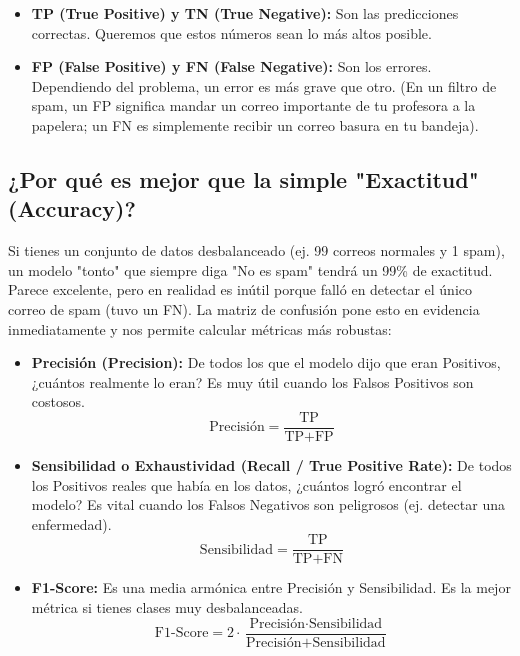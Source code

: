 \documentclass[]{article}
\begin{document}
\begin{itemize}
    \item \textbf{TP (True Positive) y TN (True Negative):} Son las predicciones correctas. Queremos que estos números sean lo más altos posible.
    \item \textbf{FP (False Positive) y FN (False Negative):} Son los errores. Dependiendo del problema, un error es más grave que otro. (En un filtro de spam, un FP significa mandar un correo importante de tu profesora a la papelera; un FN es simplemente recibir un correo basura en tu bandeja).
\end{itemize}

\subsection*{¿Por qué es mejor que la simple "Exactitud" (Accuracy)?}
Si tienes un conjunto de datos desbalanceado (ej. 99 correos normales y 1 spam), un modelo "tonto" que siempre diga "No es spam" tendrá un 99\% de exactitud. Parece excelente, pero en realidad es inútil porque falló en detectar el único correo de spam (tuvo un FN). La matriz de confusión pone esto en evidencia inmediatamente y nos permite calcular métricas más robustas:

\begin{itemize}
    \item \textbf{Precisión (Precision):} De todos los que el modelo dijo que eran Positivos, ¿cuántos realmente lo eran? Es muy útil cuando los Falsos Positivos son costosos.
    \begin{equation*}
    \text{Precisión} = \frac{\text{TP}}{\text{TP} + \text{FP}}
    \end{equation*}
    
    \item \textbf{Sensibilidad o Exhaustividad (Recall / True Positive Rate):} De todos los Positivos reales que había en los datos, ¿cuántos logró encontrar el modelo? Es vital cuando los Falsos Negativos son peligrosos (ej. detectar una enfermedad).
    \begin{equation*}
    \text{Sensibilidad} = \frac{\text{TP}}{\text{TP} + \text{FN}}
    \end{equation*}
    
    \item \textbf{F1-Score:} Es una media armónica entre Precisión y Sensibilidad. Es la mejor métrica si tienes clases muy desbalanceadas.
    \begin{equation*}
    \text{F1-Score} = 2 \cdot \frac{\text{Precisión} \cdot \text{Sensibilidad}}{\text{Precisión} + \text{Sensibilidad}}
    \end{equation*}
\end{itemize}
\end{document}
